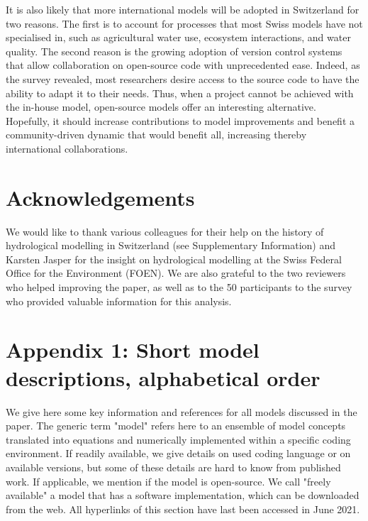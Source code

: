 \documentclass[10pt,a4paper]{article}
\begin{document}
It is also likely that more international models will be adopted in Switzerland for two reasons. The first is to account for processes that most Swiss models have not specialised in, such as agricultural water use, ecosystem interactions, and water quality. The second reason is the growing adoption of version control systems that allow collaboration on open-source code with unprecedented ease. Indeed, as the survey revealed, most researchers desire access to the source code to have the ability to adapt it to their needs. Thus, when a project cannot be achieved with the in-house model, open-source models offer an interesting alternative. Hopefully, it should increase contributions to model improvements and benefit a community-driven dynamic that would benefit all, increasing thereby international collaborations.


\section*{Acknowledgements}

We would like to thank various colleagues for their help on the history of hydrological modelling in Switzerland (see Supplementary Information) and Karsten Jasper for the insight on hydrological modelling at the Swiss Federal Office for the Environment (FOEN). We are also grateful to the two reviewers who helped improving the paper, as well as to the 50 participants to the survey who provided valuable information for this analysis.


\section*{Appendix 1: Short model descriptions, alphabetical order}
\label{appendix:1}

We give here some key information and references for all models discussed in the paper. The generic term "model" refers here to an ensemble of model concepts translated into equations and numerically implemented within a specific coding environment. If readily available, we give details on used coding language or on available versions, but some of these details are hard to know from published work. If applicable, we mention if the model is open-source. We call "freely available" a model that has a software implementation, which can be downloaded from the web. All hyperlinks of this section have last been accessed in June 2021.
\end{document}
